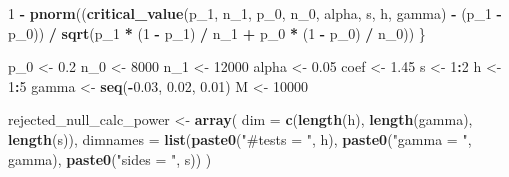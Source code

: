 \documentclass[
]{article}
\newenvironment{Shaded}{\begin{snugshade}}{\end{snugshade}}
\newcommand{\DataTypeTok}[1]{\textcolor[rgb]{0.13,0.29,0.53}{#1}}
\newcommand{\DecValTok}[1]{\textcolor[rgb]{0.00,0.00,0.81}{#1}}
\newcommand{\FloatTok}[1]{\textcolor[rgb]{0.00,0.00,0.81}{#1}}
\newcommand{\KeywordTok}[1]{\textcolor[rgb]{0.13,0.29,0.53}{\textbf{#1}}}
\newcommand{\NormalTok}[1]{#1}
\newcommand{\OperatorTok}[1]{\textcolor[rgb]{0.81,0.36,0.00}{\textbf{#1}}}
\newcommand{\StringTok}[1]{\textcolor[rgb]{0.31,0.60,0.02}{#1}}
\begin{document}
\begin{Shaded}
\begin{Highlighting}[]
{  \DecValTok{1} \OperatorTok{-}\StringTok{ }\KeywordTok{pnorm}\NormalTok{((}\KeywordTok{critical_value}\NormalTok{(p_}\DecValTok{1}\NormalTok{, n_}\DecValTok{1}\NormalTok{, p_}\DecValTok{0}\NormalTok{, n_}\DecValTok{0}\NormalTok{, alpha, s, h, gamma) }\OperatorTok{-}
\StringTok{    }\NormalTok{(p_}\DecValTok{1} \OperatorTok{-}\StringTok{ }\NormalTok{p_}\DecValTok{0}\NormalTok{)) }\OperatorTok{/}\StringTok{ }\KeywordTok{sqrt}\NormalTok{(p_}\DecValTok{1} \OperatorTok{*}\StringTok{ }\NormalTok{(}\DecValTok{1} \OperatorTok{-}\StringTok{ }\NormalTok{p_}\DecValTok{1}\NormalTok{) }\OperatorTok{/}\StringTok{ }\NormalTok{n_}\DecValTok{1} \OperatorTok{+}\StringTok{ }\NormalTok{p_}\DecValTok{0} \OperatorTok{*}\StringTok{ }\NormalTok{(}\DecValTok{1} \OperatorTok{-}\StringTok{ }\NormalTok{p_}\DecValTok{0}\NormalTok{) }\OperatorTok{/}\StringTok{ }\NormalTok{n_}\DecValTok{0}\NormalTok{))}
\NormalTok{\}}

\NormalTok{p_}\DecValTok{0}\NormalTok{ <-}\StringTok{ }\FloatTok{0.2}
\NormalTok{n_}\DecValTok{0}\NormalTok{ <-}\StringTok{ }\DecValTok{8000}
\NormalTok{n_}\DecValTok{1}\NormalTok{ <-}\StringTok{ }\DecValTok{12000}
\NormalTok{alpha <-}\StringTok{ }\FloatTok{0.05}
\NormalTok{coef <-}\StringTok{ }\FloatTok{1.45}
\NormalTok{s <-}\StringTok{ }\DecValTok{1}\OperatorTok{:}\DecValTok{2}
\NormalTok{h <-}\StringTok{ }\DecValTok{1}\OperatorTok{:}\DecValTok{5}
\NormalTok{gamma <-}\StringTok{ }\KeywordTok{seq}\NormalTok{(}\OperatorTok{-}\FloatTok{0.03}\NormalTok{, }\FloatTok{0.02}\NormalTok{, }\FloatTok{0.01}\NormalTok{)}
\NormalTok{M <-}\StringTok{ }\DecValTok{10000}

\NormalTok{rejected_null_calc_power <-}\StringTok{ }\KeywordTok{array}\NormalTok{(}
  \DataTypeTok{dim =} \KeywordTok{c}\NormalTok{(}\KeywordTok{length}\NormalTok{(h), }\KeywordTok{length}\NormalTok{(gamma), }\KeywordTok{length}\NormalTok{(s)),}
  \DataTypeTok{dimnames =} \KeywordTok{list}\NormalTok{(}\KeywordTok{paste0}\NormalTok{(}\StringTok{"#tests = "}\NormalTok{, h), }\KeywordTok{paste0}\NormalTok{(}\StringTok{"gamma = "}\NormalTok{, gamma), }\KeywordTok{paste0}\NormalTok{(}\StringTok{"sides = "}\NormalTok{, s))}
\NormalTok{)}

}
\end{Highlighting}
\end{Shaded}
\end{document}
